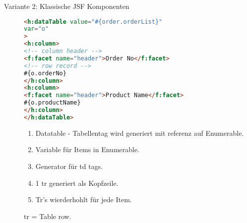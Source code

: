 \documentclass[a4paper,10pt]{scrreprt}
\begin{document}
{\begin{description}
\item[Variante 2: Klassische JSF Komponenten] 
\begin{lstlisting}[caption=Klassische JSF,language=html]
 <h:dataTable value="#{order.orderList}"
var="o"
>
<h:column>
<!-- column header -->
<f:facet name="header">Order No</f:facet>
<!-- row record -->
#{o.orderNo}
</h:column>
<h:column>
<f:facet name="header">Product Name</f:facet>
#{o.productName}
</h:column>
</h:dataTable>
\end{lstlisting}
\begin{enumerate}
 \item Datatable - Tabellentag wird generiert mit referenz auf Enumerable.
 \item Variable für Items in Enumerable.
 \item Generator für td tags.
 \item 1 tr generiert als Kopfzeile.
 \item Tr's wierderhohlt für jede Item.
\end{enumerate}
tr = Table row.



\end{description}


}
\end{document}
